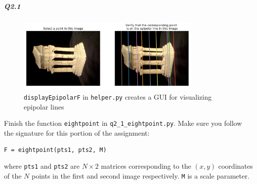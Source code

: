 \subparagraph*{Q2.1}
\begin{figure}[t]
    \centering
    \includegraphics[width=0.8\textwidth]{images/q1_3_epi.png}
    \caption{\texttt{displayEpipolarF} in \texttt{helper.py} creates a GUI for visualizing epipolar lines}
    \label{fig:epigui}
\end{figure}
Finish the function \texttt{eightpoint} in \texttt{q2\_1\_eightpoint.py}. Make sure you follow the signature for this portion of the assignment:
\begin{center}
    \texttt{F = eightpoint(pts1, pts2, M)}
\end{center}
where \texttt{pts1} and \texttt{pts2} are $N \times 2$ matrices corresponding to the $(x,y)$ coordinates of the $N$ points in the first and second image respectively. \texttt{M} is a scale parameter.
